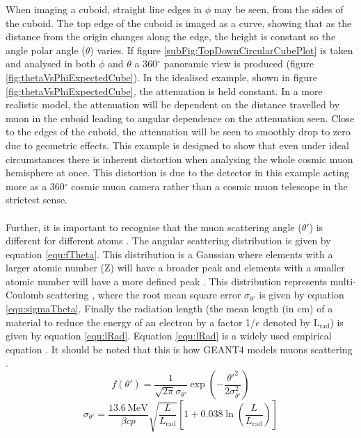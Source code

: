 When imaging a cuboid, straight line edges in $\phi$ may be seen, from the sides of the cuboid. The top edge of the cuboid is imaged as a curve, showing that as the distance from the origin changes along the edge, the height is constant so the angle polar angle ($\theta$) varies. If figure \ref{subFig:TopDownCircularCubePlot} is taken and analysed in both $\phi$ and $\theta$ a 360$^\circ$ panoramic view is produced (figure \ref{fig:thetaVsPhiExpectedCube}). In the idealised example, shown in figure \ref{fig:thetaVsPhiExpectedCube}, the attenuation is held constant. In a more realistic model, the attenuation will be dependent on the distance travelled by muon in the cuboid leading to angular dependence on the attenuation seen. Close to the edges of the cuboid, the attenuation will be seen to smoothly drop to zero due to geometric effects. This example is designed to show that even under ideal circumstances there is inherent distortion when analysing the whole cosmic muon hemisphere at once. This distortion is due to the detector in this example acting more as a 360$^\circ$ cosmic muon camera rather than a cosmic muon telescope in the strictest sense.
\\\\Further, it is important to recognise that the muon scattering angle ($\theta'$) is different for different atoms \cite{Liu2020MuonScatteringZ} \cite{tripathy2016understanding}. The angular scattering distribution is given by equation \ref{equ:fTheta}. This distribution is a Gaussian where elements with a larger atomic number (Z) will have a broader peak and elements with a smaller atomic number will have a more defined peak \cite{Liu2020MuonScatteringZ}. This distribution represents multi-Coulomb scattering \cite{Liu2020MuonScatteringZ}, \cite{tripathy2016understanding} where the root mean square error $\sigma_{\theta'}$ is given by equation \ref{equ:sigmaTheta}. Finally the radiation length (the mean length (in cm) of a material to reduce the energy of an electron by a factor 1/$e$ denoted by L$_{\textrm{rad}}$) is given by equation \ref{equ:lRad}. Equation \ref{equ:lRad} is a widely used empirical equation \cite{Liu2020MuonScatteringZ} \cite{tripathy2016understanding}. It should be noted that this is how GEANT4 models muons scattering \cite{tripathy2016understanding}.
\begin{equation}
    f(\theta') = \frac{1}{\sqrt{2\pi}\sigma_{\theta'}} \exp\left({-\frac{\theta'^2}{2\sigma_{\theta'}^2}}\right)
    \label{equ:fTheta}
\end{equation}
\begin{equation}
    \sigma_{\theta'} = \frac{13.6\,\textrm{MeV}}{\beta c p} \sqrt{\frac{L}{L_\textrm{rad}}}\left[1 + 0.038\ln{\left(\frac{L}{L_\textrm{rad}}\right)}\right]  
    \label{equ:sigmaTheta}
\end{equation}
